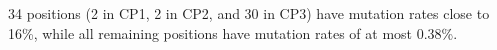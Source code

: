 34 positions (2 in CP1, 2 in CP2, and 30 in CP3) have mutation rates close to 16\%, while all remaining positions have mutation rates of at most 0.38\%.\endinput